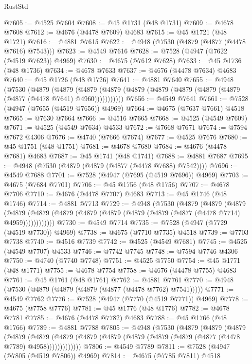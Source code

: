 \begin{lexlean}{RustStd}
\begin{coremodule}
{\begin{coremodule}
{{{{{{{{{{{{{{{{{{{{{{{{{{{{{{{{{{{{{{{{{{{{{{{{{{{{{{{{{{{{@7605 := @4525 @7604
@7608 := @45 @1731 (@48 @1731)
@7609 := @4678 @7608
@7612 := @4676 (@4478 @7609) @4683
@7615 := @45 @1721 (@48 @1721)
@7616 := @4881 @7615
@7622 := @4948 (@7530 (@4879 (@4877 (@4478 @7616) @7543)))
@7623 := @4549 @7616
@7628 := @7528 (@4947 (@7622 (@4519 @7623)) @4969)
@7630 := @4675 (@7612 @7628)
@7633 := @45 @1736 (@48 @1736)
@7634 := @4678 @7633
@7637 := @4676 (@4478 @7634) @4683
@7640 := @45 @1726 (@48 @1726)
@7641 := @4881 @7640
@7655 := @4948
    (@7530
      (@4879
        (@4879
          (@4879 (@4879 (@4879 (@4879 (@4879 (@4879 (@4879 (@4877 (@4478 @7641) @4960)))))))))))
@7656 := @4549 @7641
@7661 := @7528 (@4947 (@7655 (@4519 @7656)) @4969)
@7664 := @4675 (@7637 @7661) @4518
@7665 := @7630 @7664
@7666 := @4516 @7665
@7668 := @4525 (@4549 @7609)
@7671 := @4525 (@4549 @7634) @4533
@7672 := @7668 @7671
@7674 := @7594 @7672 @4306
@7676 := @4740 (@7666 @7674)
@7677 := @4525 @7676
@7680 := @45 @1751 (@48 @1751)
@7681 := @4678 @7680
@7684 := @4676 (@4478 @7681) @4683
@7687 := @45 @1741 (@48 @1741)
@7688 := @4881 @7687
@7695 := @4948 (@7530 (@4879 (@4879 (@4877 (@4478 @7688) @7542))))
@7696 := @4549 @7688
@7701 := @7528 (@4947 (@7695 (@4519 @7696)) @4969)
@7703 := @4675 (@7684 @7701)
@7706 := @45 @1756 (@48 @1756)
@7707 := @4678 @7706
@7710 := @4676 (@4478 @7707) @4683
@7713 := @45 @1746 (@48 @1746)
@7714 := @4881 @7713
@7729 := @4948
    (@7530
      (@4879
        (@4879
          (@4879
            (@4879 (@4879 (@4879 (@4879 (@4879 (@4879 (@4879 (@4877 (@4478 @7714) @4959))))))))))))
@7730 := @4549 @7714
@7735 := @7528 (@4947 (@7729 (@4519 @7730)) @4969)
@7738 := @4675 (@7710 @7735) @4518
@7739 := @7703 @7738
@7740 := @4516 @7739
@7742 := @4525 (@4549 @7681)
@7745 := @4525 (@4549 @7707) @4533
@7746 := @7742 @7745
@7748 := @7594 @7746 @4306
@7750 := @4740 (@7740 @7748)
@7751 := @4525 @7750
@7754 := @45 @1771 (@48 @1771)
@7755 := @4678 @7754
@7758 := @4676 (@4478 @7755) @4683
@7761 := @45 @1761 (@48 @1761)
@7762 := @4881 @7761
@7770 := @4948 (@7530 (@4879 (@4879 (@4879 (@4877 (@4478 @7762) @7541)))))
@7771 := @4549 @7762
@7776 := @7528 (@4947 (@7770 (@4519 @7771)) @4969)
@7778 := @4675 (@7758 @7776)
@7781 := @45 @1776 (@48 @1776)
@7782 := @4678 @7781
@7785 := @4676 (@4478 @7782) @4683
@7788 := @45 @1766 (@48 @1766)
@7789 := @4881 @7788
@7805 := @4948
    (@7530
      (@4879
        (@4879
          (@4879
            (@4879
              (@4879
                (@4879 (@4879 (@4879 (@4879 (@4879 (@4879 (@4877 (@4478 @7789) @4958)))))))))))))
@7806 := @4549 @7789
@7811 := @7528 (@4947 (@7805 (@4519 @7806)) @4969)
@7814 := @4675 (@7785 @7811) @4518
}}}}}}}}}}}}}}}}}}}}}}}}}}}}}}}}}}}}}}}}}}}}}}}}}}}}}}}}}}}}
\end{coremodule}}
\end{coremodule}
\end{lexlean}
